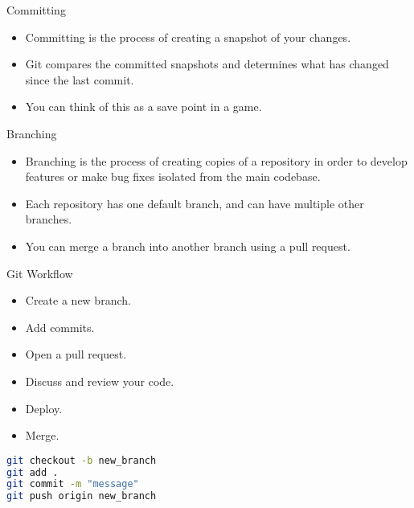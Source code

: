 \documentclass[
    aspectratio=169, 
    usepdftitle=false, 
    xcolor={dvipsnames},
    hyperref={
        colorlinks,
        linkcolor=black,
        urlcolor=blue}
    ]{beamer}
\begin{document}
\begin{frame}{Committing}
    \begin{itemize}
        \item Committing is the process of creating a snapshot of your changes.
        \item Git compares the committed snapshots and determines what has changed since the last commit.
        \item You can think of this as a save point in a game.
    \end{itemize}
\end{frame}

\begin{frame}{Branching}
    \begin{itemize}
        \item Branching is the process of creating copies of a repository in order to develop features or make bug fixes isolated from the main codebase.
        \item Each repository has one default branch, and can have multiple other branches.
        \item You can merge a branch into another branch using a pull request.
    \end{itemize}
\end{frame}

\begin{frame}[fragile]{Git Workflow}
    \begin{itemize}
        \item Create a new branch.
        \item Add commits.
        \item Open a pull request.
        \item Discuss and review your code.
        \item Deploy.
        \item Merge.
    \end{itemize}

    \begin{lstlisting}[style=output, language=bash]
git checkout -b new_branch
git add .
git commit -m "message"
git push origin new_branch
    \end{lstlisting}

\end{frame}
\end{document}
